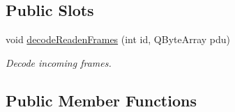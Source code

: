 \subsection*{Public Slots}
\begin{DoxyCompactItemize}
\item 
void \hyperlink{classmdt_device_modbus_a8d38b8cc19a8c1f1a7305eb89cb1eda2}{decodeReadenFrames} (int id, QByteArray pdu)
\begin{DoxyCompactList}\small\item\em Decode incoming frames. \end{DoxyCompactList}\end{DoxyCompactItemize}
\subsection*{Public Member Functions}

